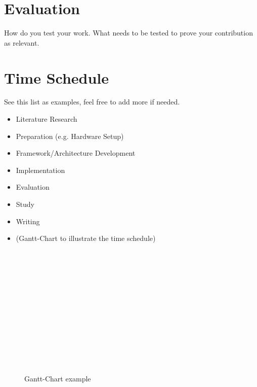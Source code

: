 \documentclass[]{hci-proposal}
\begin{document}
\section{Evaluation}
How do you test your work.
What needs to be tested to prove your contribution as relevant.

\section{Time Schedule}
See this list as examples, feel free to add more if needed.
\begin{itemize}
\item Literature Research
\item Preparation (e.g. Hardware Setup)
\item Framework/Architecture Development
\item Implementation
\item Evaluation
\item Study
\item Writing
\item (Gantt-Chart to illustrate the time schedule)
\end{itemize}


\begin{landscape}
  \begin{figure*}[htbp]
    \begin{ganttchart}[vgrid, hgrid, y unit chart=0.7cm]{1}{24}
       \\
       \\

       \\
       \\
       \\
       \\
       \\

       \\
       \\
       \\
       \\
    \end{ganttchart}
    \label{gc}
    \caption{Gantt-Chart example}
  \end{figure*}
\end{landscape}
\end{document}
